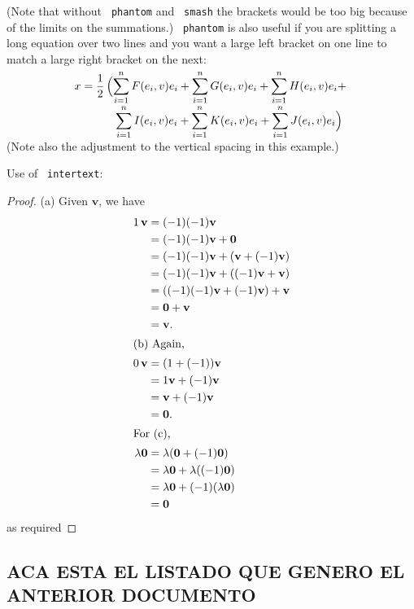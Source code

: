 \documentclass[a4paper]{article}
\newcommand{\cn}[1]{\texttt{\char92 #1}}
\begin{document}
(Note that without \cn{phantom} and \cn{smash} the brackets would
be too big because of the limits on the summations.) \cn{phantom}
is also useful if you are splitting a long equation over two lines
and you want a large left bracket on one line to match a large
right bracket on the next:
\begin{align*}
x&= \frac{1}{2} \left(\smash{\sum_{i=1}^n F(e_i,v) e_i
}\vphantom{\sum}+
\smash{\sum_{i=1}^n G(e_i,v) e_i} +\smash{\sum_{i=1}^n H(e_i,v) e_i }\vphantom{\sum}+\right.\\[8pt]
&\phantom{=}\qquad\left.\smash{\sum_{i=1}^n I(e_i,v) e_i
}\vphantom{\sum}+ \smash{\sum_{i=1}^n K(e_i,v) e_i} +
\smash{\sum_{i=1}^n J(e_i,v) e_i}\vphantom{\sum}\right)
\end{align*}
(Note also the adjustment to the vertical spacing in this
example.)

Use of \cn{intertext}:
\begin{proof} (a) Given $\mathbf v$, we have
\begin{align*}
1\,\mathbf v &= (-1)(-1)\mathbf v \\
&=(-1)(-1)\mathbf v +\mathbf 0  \\
&=(-1)(-1)\mathbf v + (\mathbf v + (-1)\mathbf v) \\
&=(-1)(-1)\mathbf v + ((-1)\mathbf v + \mathbf v) \\
&=((-1)(-1)\mathbf v + (-1)\mathbf v) + \mathbf v \\
&= \mathbf 0+\mathbf v \\
&= \mathbf v. \\
\intertext{(b) Again,}
0\,\mathbf v &= (1+(-1))\mathbf v \\
&= 1\mathbf v+(-1)\mathbf v\\
&= \mathbf v+(-1)\mathbf v \\
&= \mathbf 0.\\
\intertext{For (c),}
\lambda \mathbf 0 &= \lambda(\mathbf 0 + (-1)\mathbf 0) \\
&= \lambda \mathbf 0 + \lambda((-1)\mathbf 0) \\
&= \lambda \mathbf 0 + (-1)(\lambda \mathbf 0) \\
&=\mathbf 0
\end{align*}
as required
\end{proof}\begin{center}
\section{ACA ESTA EL LISTADO QUE GENERO EL ANTERIOR
DOCUMENTO}\end{center}
\end{document}
